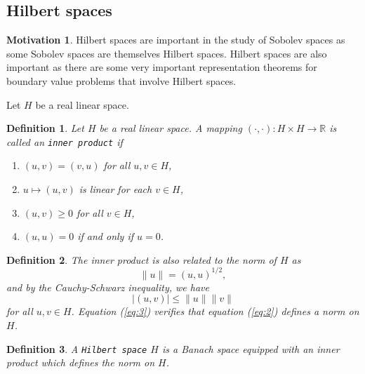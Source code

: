 \documentclass[11pt]{article}
\newtheorem{definition}{Definition}
\theoremstyle{definition}
\newtheorem*{motivation}{Motivation}
\begin{document}
\subsection{Hilbert spaces}
\begin{motivation}
	Hilbert spaces are important in the study of Sobolev spaces as some Sobolev spaces are themselves Hilbert spaces.
	Hilbert spaces are also important as there are some very important representation theorems for boundary value problems that involve Hilbert spaces.
\end{motivation}
Let $H$ be a real linear space.
\begin{definition}
	Let $H$ be a real linear space. A mapping $(\cdot , \cdot) : H \times H \rightarrow \mathbb{R}$ is called an \texttt{inner product} if
	\begin{enumerate}
		\item $(u,v) = (v,u)$ for all $u,v \in H$,
		\item $u \mapsto (u,v)$ is linear for each $v \in H$,
		\item $(u,v) \geq 0$ for all $v \in H$,
		\item $(u,u) = 0$ if and only if $u = 0$.
	\end{enumerate}
\end{definition}
\begin{definition}
	The inner product is also related to the norm of $H$ as
	\begin{equation}
		\label{eq:2}
		\|u\| = (u,u)^{1/2},
	\end{equation}
	and by the Cauchy-Schwarz inequality, we have
	\begin{equation}
		\label{eq:3}
		|(u,v)| \leq \|u\|\|v\|
	\end{equation}
	for all $u,v \in H$. Equation (\ref{eq:3}) verifies that equation (\ref{eq:2}) defines a norm on $H$. 
\end{definition}
\begin{definition}
	A \texttt{Hilbert space} $H$ is a Banach space equipped with an inner product which defines the norm on $H$.
\end{definition}
\end{document}
